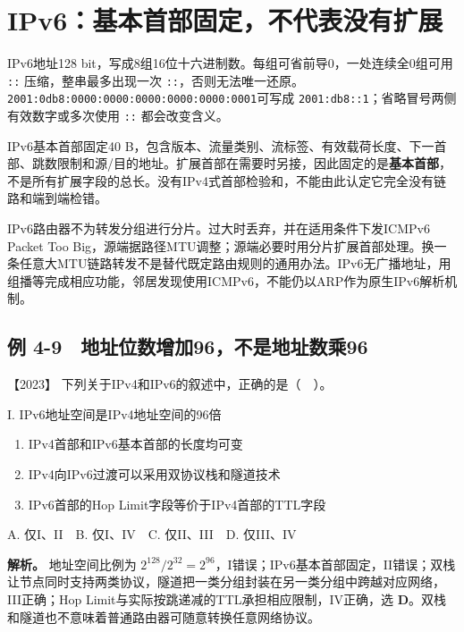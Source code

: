 \section{IPv6：基本首部固定，不代表没有扩展}\label{cn-04-14}

IPv6地址128 bit，写成8组16位十六进制数。每组可省前导0，一处连续全0组可用 \allowbreak{}\texttt{::} 压缩，整串最多出现一次 \allowbreak{}\texttt{::}，否则无法唯一还原。\allowbreak{}\texttt{2001:0db8:0000:0000:0000:0000:0000:0001}可写成 \allowbreak{}\texttt{2001:db8::1}；省略冒号两侧有效数字或多次使用 \allowbreak{}\texttt{::} 都会改变含义。

IPv6基本首部固定40 B，包含版本、流量类别、流标签、有效载荷长度、下一首部、跳数限制和源/目的地址。扩展首部在需要时另接，因此固定的是\textbf{基本首部}，不是所有扩展字段的总长。没有IPv4式首部检验和，不能由此认定它完全没有链路和端到端检错。

IPv6路由器不为转发分组进行分片。过大时丢弃，并在适用条件下发ICMPv6 Packet Too Big，源端据路径MTU调整；源端必要时用分片扩展首部处理。换一条任意大MTU链路转发不是替代既定路由规则的通用办法。IPv6无广播地址，用组播等完成相应功能，邻居发现使用ICMPv6，不能仍以ARP作为原生IPv6解析机制。

\subsection{例 4-9　地址位数增加96，不是地址数乘96}\label{cn-ex4-9}

\noindent{}【2023】 下列关于IPv4和IPv6的叙述中，正确的是（　）。

I. IPv6地址空间是IPv4地址空间的96倍

\begin{enumerate}
\def\labelenumi{\Roman{enumi}.}
\setcounter{enumi}{1}
\item
  IPv4首部和IPv6基本首部的长度均可变
\item
  IPv4向IPv6过渡可以采用双协议栈和隧道技术
\item
  IPv6首部的Hop Limit字段等价于IPv4首部的TTL字段
\end{enumerate}

A. 仅I、II　B. 仅I、IV　C. 仅II、III　D. 仅III、IV


\textbf{解析。} 地址空间比例为 \(2^{128}/2^{32}=2^{96}\)，I错误；IPv6基本首部固定，II错误；双栈让节点同时支持两类协议，隧道把一类分组封装在另一类分组中跨越对应网络，III正确；Hop Limit与实际按跳递减的TTL承担相应限制，IV正确，选 \textbf{D}。双栈和隧道也不意味着普通路由器可随意转换任意网络协议。

